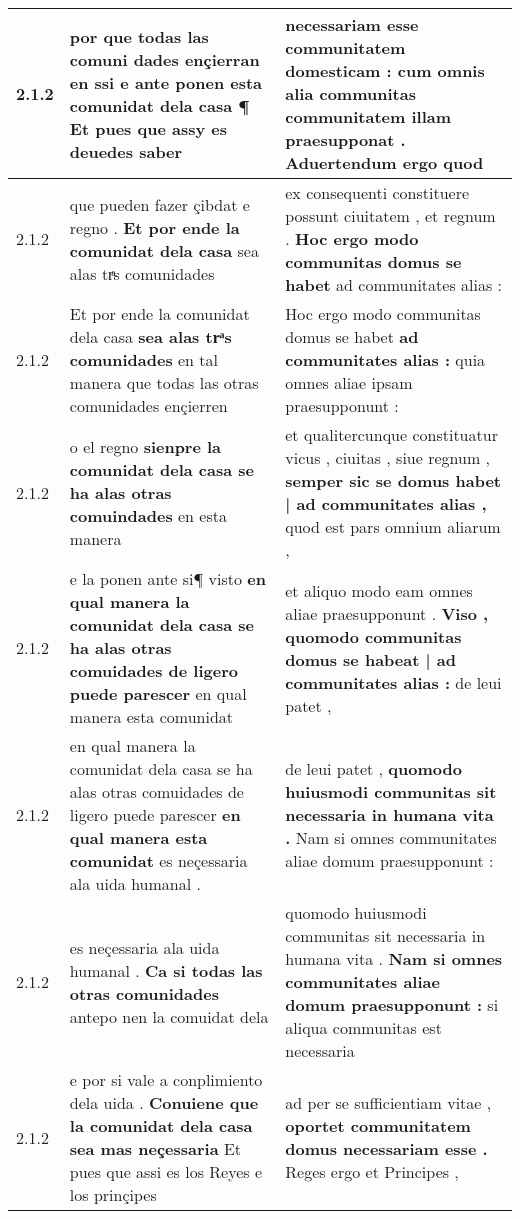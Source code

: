 \begin{tabular}{|p{1cm}|p{6.5cm}|p{6.5cm}|}
2.1.2 & por que todas las comuni dades ençierran en ssi \textbf{ e ante ponen esta comunidat dela casa ¶ Et } pues que assy es deuedes saber & necessariam esse communitatem domesticam : \textbf{ cum omnis alia communitas communitatem illam praesupponat . } Aduertendum ergo quod \\\hline
2.1.2 & que pueden fazer çibdat e regno . \textbf{ Et por ende la comunidat dela casa } sea alas trͣs comunidades & ex consequenti constituere possunt ciuitatem , et regnum . \textbf{ Hoc ergo modo communitas domus se habet } ad communitates alias : \\\hline
2.1.2 & Et por ende la comunidat dela casa \textbf{ sea alas trͣs comunidades } en tal manera que todas las otras comunidades ençierren & Hoc ergo modo communitas domus se habet \textbf{ ad communitates alias : } quia omnes aliae ipsam praesupponunt : \\\hline
2.1.2 & o el regno \textbf{ sienpre la comunidat dela casa se ha alas otras comuindades } en esta manera & et qualitercunque constituatur vicus , ciuitas , siue regnum , \textbf{ semper sic se domus habet | ad communitates alias , } quod est pars omnium aliarum , \\\hline
2.1.2 & e la ponen ante si¶ visto \textbf{ en qual manera la comunidat dela casa se ha alas otras comuidades de ligero puede parescer } en qual manera esta comunidat & et aliquo modo eam omnes aliae praesupponunt . \textbf{ Viso , quomodo communitas domus se habeat | ad communitates alias : } de leui patet , \\\hline
2.1.2 & en qual manera la comunidat dela casa se ha alas otras comuidades de ligero puede parescer \textbf{ en qual manera esta comunidat } es neçessaria ala uida humanal . & de leui patet , \textbf{ quomodo huiusmodi communitas sit necessaria in humana vita . } Nam si omnes communitates aliae domum praesupponunt : \\\hline
2.1.2 & es neçessaria ala uida humanal . \textbf{ Ca si todas las otras comunidades } antepo nen la comuidat dela & quomodo huiusmodi communitas sit necessaria in humana vita . \textbf{ Nam si omnes communitates aliae domum praesupponunt : } si aliqua communitas est necessaria \\\hline
2.1.2 & e por si vale a conplimiento dela uida . \textbf{ Conuiene que la comunidat dela casa sea mas neçessaria } Et pues que assi es los Reyes e los prinçipes & ad per se sufficientiam vitae , \textbf{ oportet communitatem domus necessariam esse . } Reges ergo et Principes , \\\hline

\end{tabular}
